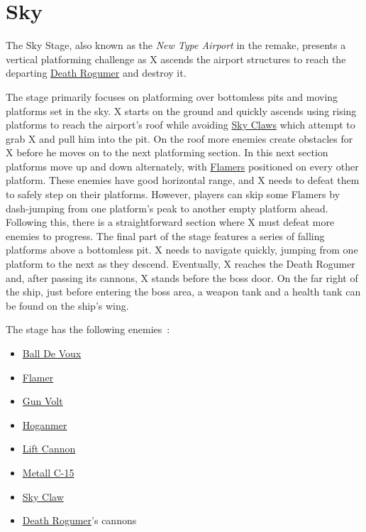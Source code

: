 \section{Sky}
The Sky Stage, also known as the \textit{New Type Airport} in the remake, presents a vertical platforming challenge as X ascends the airport structures to reach the departing \hyperlink{vehicle:Death_Rogumer}{Death Rogumer} and destroy it.

The stage primarily focuses on platforming over bottomless pits and moving platforms set in the sky. X starts on the ground and quickly ascends using rising platforms to reach the airport's roof while avoiding \hyperlink{enem:Sky_Claw}{Sky Claws} which attempt to grab X and pull him into the pit. On the roof more enemies create obstacles for X before he moves on to the next platforming section. In this next section platforms move up and down alternately, with \hyperlink{enem:Flamer}{Flamers} positioned on every other platform. These enemies have good horizontal range, and X needs to defeat them to safely step on their platforms. However, players can skip some Flamers by dash-jumping from one platform's peak to another empty platform ahead. Following this, there is a straightforward section where X must defeat more enemies to progress. The final part of the stage features a series of falling platforms above a bottomless pit. X needs to navigate quickly, jumping from one platform to the next as they descend. Eventually, X reaches the Death Rogumer and, after passing its cannons, X stands before the boss door. On the far right of the ship, just before entering the boss area, a weapon tank and a health tank can be found on the ship's wing.

The stage has the following enemies~\cite{wiki:Airport}:
\begin{itemize}
	\item \hyperlink{enem:Ball_De_Voux}{Ball De Voux }
	\item \hyperlink{enem:Flamer}{Flamer}
	\item \hyperlink{enem:Gun_Volt}{Gun Volt}
	\item \hyperlink{enem:Hoganmer}{Hoganmer}
	\item \hyperlink{enem:Lift_Cannon}{Lift Cannon}
	\item \hyperlink{enem:Metall_C-15}{Metall C-15}
	\item \hyperlink{enem:Sky_Claw}{Sky Claw}
	\item \hyperlink{vehicle:Death_Rogumer}{Death Rogumer}'s cannons
\end{itemize}

